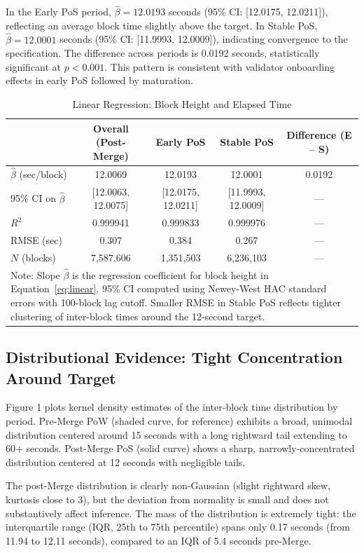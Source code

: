 \documentclass[12pt]{article}
\begin{document}
In the Early PoS period, $\hat{\beta} = 12.0193$ seconds (95\% CI: [12.0175, 12.0211]), reflecting an average block time slightly above the target. In Stable PoS, $\hat{\beta} = 12.0001$ seconds (95\% CI: [11.9993, 12.0009]), indicating convergence to the specification. The difference across periods is 0.0192 seconds, statistically significant at $p < 0.001$. This pattern is consistent with validator onboarding effects in early PoS followed by maturation.

\begin{table}[h]
\centering
\caption{Linear Regression: Block Height and Elapsed Time}
\label{tab:regression}
\begin{tabular}{lcccc}
\toprule
& Overall (Post-Merge) & Early PoS & Stable PoS & Difference (E – S) \\
\midrule
$\hat{\beta}$ (sec/block) & 12.0069 & 12.0193 & 12.0001 & 0.0192 \\
95\% CI on $\hat{\beta}$ & [12.0063, 12.0075] & [12.0175, 12.0211] & [11.9993, 12.0009] & — \\
$R^2$ & 0.999941 & 0.999833 & 0.999976 & — \\
RMSE (sec) & 0.307 & 0.384 & 0.267 & — \\
$N$ (blocks) & 7,587,606 & 1,351,503 & 6,236,103 & — \\
\bottomrule
\multicolumn{5}{p{12cm}}{\footnotesize Note: Slope $\hat{\beta}$ is the regression coefficient for block height in Equation~\eqref{eq:linear}. 95\% CI computed using Newey-West HAC standard errors with 100-block lag cutoff. Smaller RMSE in Stable PoS reflects tighter clustering of inter-block times around the 12-second target.}
\end{tabular}
\end{table}

\subsection{Distributional Evidence: Tight Concentration Around Target}

Figure 1 plots kernel density estimates of the inter-block time distribution by period. Pre-Merge PoW (shaded curve, for reference) exhibits a broad, unimodal distribution centered around 15 seconds with a long rightward tail extending to 60+ seconds. Post-Merge PoS (solid curve) shows a sharp, narrowly-concentrated distribution centered at 12 seconds with negligible tails.

The post-Merge distribution is clearly non-Gaussian (slight rightward skew, kurtosis close to 3), but the deviation from normality is small and does not substantively affect inference. The mass of the distribution is extremely tight: the interquartile range (IQR, 25th to 75th percentile) spans only 0.17 seconds (from 11.94 to 12.11 seconds), compared to an IQR of 5.4 seconds pre-Merge.
\end{document}
